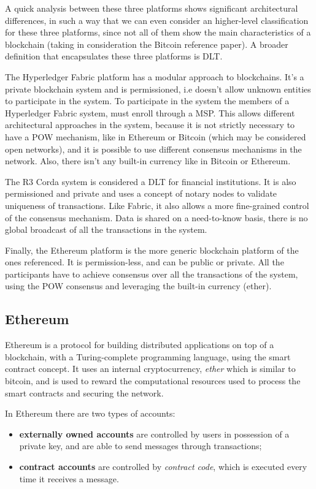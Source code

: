 A quick analysis between these three platforms shows significant architectural differences, in such a way that we can even consider an higher-level classification for these three platforms, since not all of them show the main characteristics of a blockchain (taking in consideration the Bitcoin reference paper).
A broader definition that encapsulates these three platforms is \ac{DLT}.

The Hyperledger Fabric platform has a modular approach to blockchains. It's a private blockchain system  and is permissioned, i.e doesn't allow unknown entities to participate in the system.
To participate in the system the members of a Hyperledger Fabric system, must enroll through a \ac{MSP}.
This allows different architectural approaches in the system, because it is not strictly necessary to have a \ac{POW} mechanism, like in Ethereum or Bitcoin (which may be considered open networks), and it is possible to use different consensus mechanisms in the network.
Also, there isn't any built-in currency like in Bitcoin or Ethereum.

The R3 Corda system is considered a \ac{DLT} for financial institutions.
It is also permissioned and private and uses a concept of notary nodes to validate uniqueness of transactions. Like Fabric, it also allows a more fine-grained control of the consensus mechanism.
Data is shared on a need-to-know basis, there is no global broadcast of all the transactions in the system.

Finally, the Ethereum platform is the more generic blockchain platform of the ones referenced.
It is permission-less, and can be public or private.
All the participants have to achieve consensus over all the transactions of the system, using the \ac{POW} consensus and leveraging the built-in currency (ether).

\subsection{Ethereum} Ethereum is a protocol for building distributed applications on top of a blockchain, with a Turing-complete programming language, using the smart contract concept.
It uses an internal cryptocurrency, \textit{ether} which is similar to bitcoin, and is used to reward the computational resources used to process the smart contracts and securing the network.

In Ethereum there are two types of accounts:

\begin{itemize}
	\item \textbf{externally owned accounts} are controlled by users in possession of a private key, and are able to send messages through transactions;
	\item \textbf{contract accounts} are controlled by \textit{contract code}, which is executed every time it receives a message.
\end{itemize}


